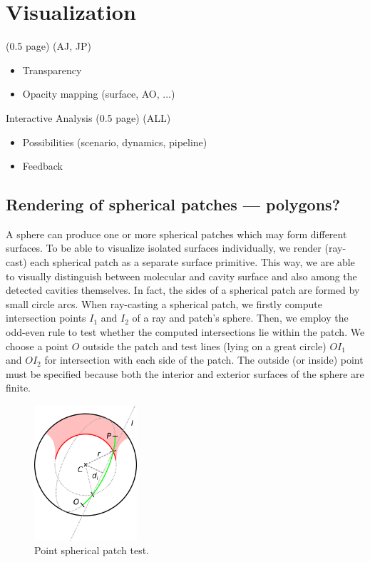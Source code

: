 \section{Visualization} (0.5 page) (AJ, JP)
\label{sec:vis}
\begin{itemize}
  \item Transparency
	\item Opacity mapping (surface, AO, ...)
\end{itemize}

Interactive Analysis (0.5 page) (ALL)
\begin{itemize}
  \item Possibilities (scenario, dynamics, pipeline)
  \item Feedback
\end{itemize}

\subsection{Rendering of spherical patches --- polygons?}
\label{sec:spherical-patches}
A sphere can produce one or more spherical patches which may form different surfaces.
To be able to visualize isolated surfaces individually, we render (ray-cast) each spherical patch as a separate surface primitive.
This way, we are able to visually distinguish between molecular and cavity surface and also among the detected cavities themselves.
In fact, the sides of a spherical patch are formed by small circle arcs.
When ray-casting a spherical patch, we firstly compute intersection points $I_1$ and $I_2$ of a ray and patch's sphere.
Then, we employ the odd-even rule to test whether the computed intersections lie within the patch.
We choose a point $O$ outside the patch and test lines (lying on a great circle) $OI_1$ and $OI_2$ for intersection with each side of the patch.
The outside (or inside) point must be specified because both the interior and exterior surfaces of the sphere are finite.

\begin{figure}[htb]
  \centering
  \includegraphics[width=1.5in]{image/patch.png}
  \caption{Point spherical patch test.}
\end{figure}

